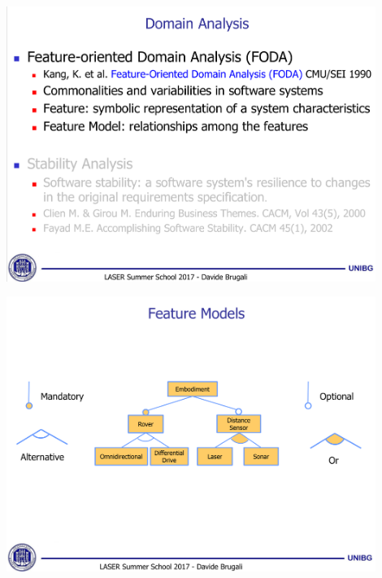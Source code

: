 \documentclass[xetex,mathserif,serif]{beamer}
\begin{document}
	\begin{frame}
		\begin{center}
			\includegraphics[width=0.9\textwidth]{brugali6.png}
		\end{center}
	\end{frame}

	\begin{frame}
		\begin{center}
			\includegraphics[width=0.9\textwidth]{brugali7.png}
		\end{center}
	\end{frame}
\end{document}
